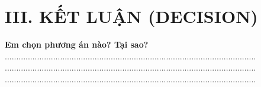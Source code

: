 \documentclass[12pt,a4paper]{article}
\begin{document}
\section*{\color{fingreen} III. KẾT LUẬN (DECISION)}
\textbf{Em chọn phương án nào? Tại sao?}
.............................................................................................................
.............................................................................................................
.............................................................................................................
\end{document}
